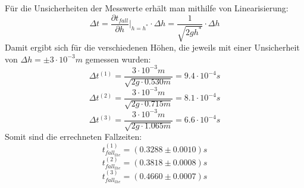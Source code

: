\documentclass{report}
\begin{document}
    Für die Unsicherheiten der Messwerte erhält man mithilfe von Linearisierung:
    \begin{equation}
        \Delta t = \frac{\partial t_{fall}}{\partial h} |_{h=h^*} \cdot \Delta h = \frac{1}{\sqrt{2gh^*}} \cdot \Delta h
    \end{equation}
    Damit ergibt sich für die verschiedenen Höhen, die jeweils mit einer Unsicherheit von $\Delta h = \pm 3 \cdot 10^{-3}m$  gemessen wurden:
    \begin{equation*}
        \Delta t^{(1)} = \frac{3 \cdot 10^{-3}m}{\sqrt{2g \cdot 0.530m}} = 9.4 \cdot 10^{-4} s
    \end{equation*}
    \begin{equation*}
        \Delta t^{(2)} = \frac{3 \cdot 10^{-3}m}{\sqrt{2g \cdot 0.715m}} = 8.1 \cdot 10^{-4} s
    \end{equation*}
    \begin{equation*}
        \Delta t^{(3)} = \frac{3 \cdot 10^{-3}m}{\sqrt{2g \cdot 1.065m}} = 6.6 \cdot 10^{-4} s
    \end{equation*}
    Somit sind die errechneten Fallzeiten:
    \begin{equation*}
        t^{(1)}_{fall_{the}} = (0.3288 \pm 0.0010)s
    \end{equation*}
    \begin{equation*}
        t^{(2)}_{fall_{the}} = (0.3818 \pm 0.0008)s
    \end{equation*}    
    \begin{equation*}
        t^{(3)}_{fall_{the}} = (0.4660 \pm 0.0007)s
    \end{equation*}
\end{document}
